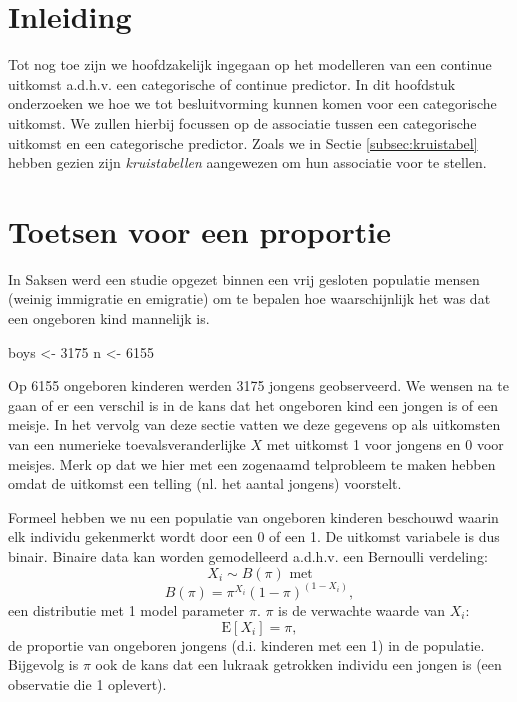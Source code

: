 \documentclass[12pt,dutch,coursenotes]{book}
\newenvironment{Shaded}{\begin{snugshade}}{\end{snugshade}}
\newcommand{\DecValTok}[1]{\textcolor[rgb]{0.00,0.00,0.81}{#1}}
\newcommand{\StringTok}[1]{\textcolor[rgb]{0.31,0.60,0.02}{#1}}
\newcommand{\NormalTok}[1]{#1}
\theoremstyle{definition}
\theoremstyle{definition}
\theoremstyle{definition}
\theoremstyle{remark}
\begin{document}
\section{Inleiding}\label{inleiding-7}

Tot nog toe zijn we hoofdzakelijk ingegaan op het modelleren van een
continue uitkomst a.d.h.v. een categorische of continue predictor. In
dit hoofdstuk onderzoeken we hoe we tot besluitvorming kunnen komen voor
een categorische uitkomst. We zullen hierbij focussen op de associatie
tussen een categorische uitkomst en een categorische predictor. Zoals we
in Sectie \ref{subsec:kruistabel} hebben gezien zijn
\emph{kruistabellen} aangewezen om hun associatie voor te stellen.

\section{Toetsen voor een proportie}\label{toetsen-voor-een-proportie}

In Saksen werd een studie opgezet binnen een vrij gesloten populatie
mensen (weinig immigratie en emigratie) om te bepalen hoe waarschijnlijk
het was dat een ongeboren kind mannelijk is.

\begin{Shaded}
\begin{Highlighting}[]
\NormalTok{boys <-}\StringTok{ }\DecValTok{3175}
\NormalTok{n <-}\StringTok{ }\DecValTok{6155}
\end{Highlighting}
\end{Shaded}

Op 6155 ongeboren kinderen werden 3175 jongens geobserveerd. We wensen
na te gaan of er een verschil is in de kans dat het ongeboren kind een
jongen is of een meisje. In het vervolg van deze sectie vatten we deze
gegevens op als uitkomsten van een numerieke toevalsveranderlijke \(X\)
met uitkomst 1 voor jongens en 0 voor meisjes. Merk op dat we hier met
een zogenaamd telprobleem te maken hebben omdat de uitkomst een telling
(nl. het aantal jongens) voorstelt.

Formeel hebben we nu een populatie van ongeboren kinderen beschouwd
waarin elk individu gekenmerkt wordt door een 0 of een 1. De uitkomst
variabele is dus binair. Binaire data kan worden gemodelleerd a.d.h.v.
een Bernoulli verdeling: \[X_i \sim B(\pi) \text{ met}\]
\[B(\pi)=\pi^{X_i}(1-\pi)^{(1-X_i)},\] een distributie met 1 model
parameter \(\pi\). \(\pi\) is de verwachte waarde van \(X_i\):
\[\text{E}[X_i]=\pi,\] de proportie van ongeboren jongens (d.i. kinderen
met een 1) in de populatie. Bijgevolg is \(\pi\) ook de kans dat een
lukraak getrokken individu een jongen is (een observatie die 1
oplevert).
\end{document}
